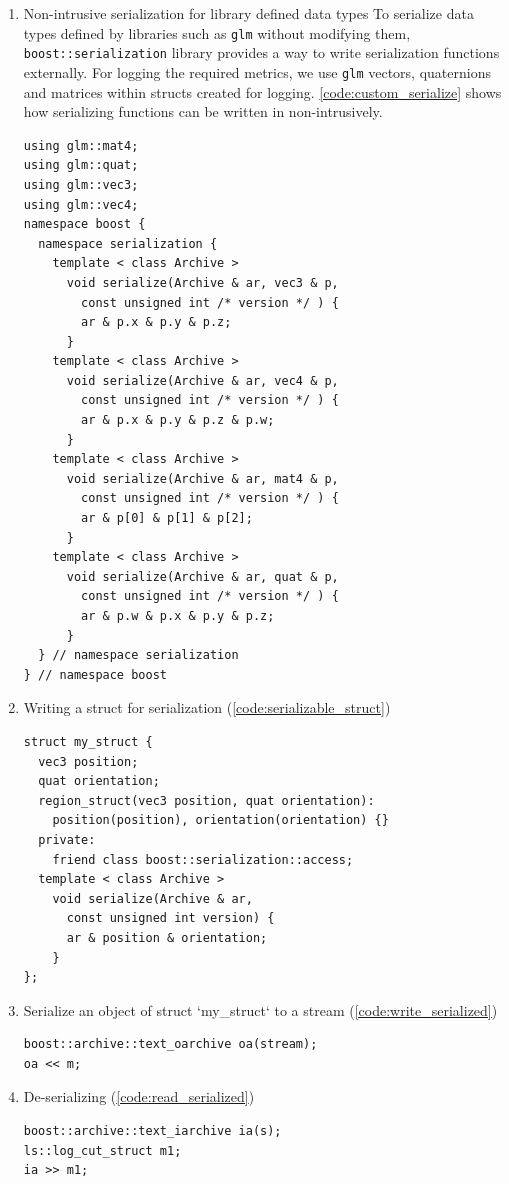 \begin{enumerate}
    \item Non-intrusive serialization for library defined data types
    To serialize data types defined by libraries such as \texttt{glm} without modifying them, \texttt{boost::serialization} library provides a way to write serialization functions externally. For logging the required metrics, we use \texttt{glm} vectors, quaternions and matrices within structs created for logging. \autoref{code:custom_serialize} shows how serializing functions can be written in non-intrusively.
    \begin{lstlisting}[style=CStyle, caption={Serializing custom data types},label={code:custom_serialize}]
using glm::mat4;
using glm::quat;
using glm::vec3;
using glm::vec4;
namespace boost {
  namespace serialization {
    template < class Archive >
      void serialize(Archive & ar, vec3 & p,
        const unsigned int /* version */ ) {
        ar & p.x & p.y & p.z;
      }
    template < class Archive >
      void serialize(Archive & ar, vec4 & p,
        const unsigned int /* version */ ) {
        ar & p.x & p.y & p.z & p.w;
      }
    template < class Archive >
      void serialize(Archive & ar, mat4 & p,
        const unsigned int /* version */ ) {
        ar & p[0] & p[1] & p[2];
      }
    template < class Archive >
      void serialize(Archive & ar, quat & p,
        const unsigned int /* version */ ) {
        ar & p.w & p.x & p.y & p.z;
      }
  } // namespace serialization
} // namespace boost
    \end{lstlisting}
    \item Writing a struct for serialization (\autoref{code:serializable_struct})
    \begin{lstlisting}[style=CStyle, caption={A struct with serialize function written within it},label={code:serializable_struct}]
struct my_struct {
  vec3 position;
  quat orientation;
  region_struct(vec3 position, quat orientation):
    position(position), orientation(orientation) {}
  private:
    friend class boost::serialization::access;
  template < class Archive >
    void serialize(Archive & ar,
      const unsigned int version) {
      ar & position & orientation;
    }
};
    \end{lstlisting}
    \item Serialize an object of struct `my\_struct` to a stream (\autoref{code:write_serialized})
    \begin{lstlisting}[style=CStyle, caption={Writing struct to a stream}, label={code:write_serialized}]
boost::archive::text_oarchive oa(stream);
oa << m;
    \end{lstlisting}
    \item De-serializing (\autoref{code:read_serialized})
    \begin{lstlisting}[style=CStyle, caption={Reading/De-serializing struct from a stream},label={code:read_serialized}]
boost::archive::text_iarchive ia(s);
ls::log_cut_struct m1;
ia >> m1;
    \end{lstlisting}
\end{enumerate}

